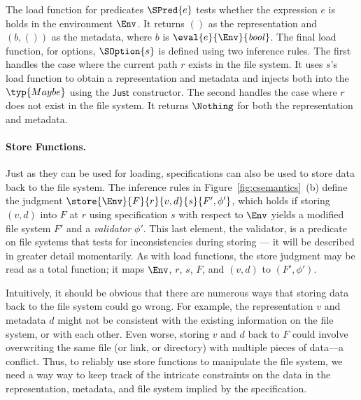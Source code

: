 The load function for predicates $\SPred{e}$ tests whether the
expression $e$ is holds in the environment $\Env$. It returns $()$ as
the representation and $(b,())$ as the metadata, where $b$ is
$\eval{e}{\Env}{\mathit{bool}}$. The final load function, for options,
$\SOption{s}$ is defined using two inference rules. The first handles
the case where the current path $r$ exists in the file system. It uses
$s$'s load function to obtain a representation and metadata and
injects both into the $\typ{Maybe}$ using the $\mathsf{Just}$
constructor. The second handles the case where $r$ does not exist in
the file system. It returns $\Nothing$ for both the representation and
metadata.

\paragraph*{Store Functions.}
%
Just as they can be used for loading, \forest{} specifications can
also be used to store data back to the file system. The inference
rules in Figure~\ref{fig:csemantics}~(b) define the judgment
$\store{\Env}{F}{r}{v,d}{s}{F',\phi'}$, which holds if storing $(v,d)$
into $F$ at $r$ using specification $s$ with respect to $\Env$ yields
a modified file system $F'$ and a {\em validator} $\phi'$.  This
last element, the validator, is a
predicate on file systems that tests for inconsistencies during
storing --- it will be described in greater detail momentarily. As with load functions, the store judgment may be read as a total
function; it maps $\Env$, $r$, $s$, $F$, and $(v,d)$ to $(F',\phi')$.

Intuitively, it should be obvious that there are numerous ways that
storing data back to the file system could go wrong. For example, the
representation $v$ and metadata $d$ might not be consistent with the
existing information on the file system, or with each other. Even
worse, storing $v$ and $d$ back to $F$ could involve overwriting the
same file (or link, or directory) with multiple pieces of data---a
conflict. Thus, to reliably use store functions to manipulate the file
system, we need a way way to keep track of the intricate constraints
on the data in the representation, metadata, and file system implied
by the specification.

